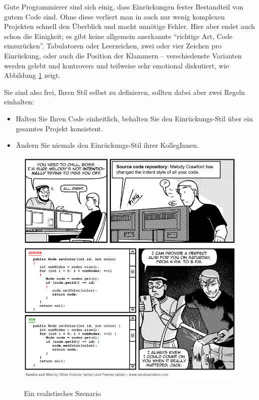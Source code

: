 \begin{hintbox}
Gute Programmierer sind sich einig, dass Einrückungen fester Bestandteil von gutem Code sind. Ohne diese verliert man in auch nur wenig komplexen Projekten schnell den Überblick und macht unnötige Fehler. Hier aber endet auch schon die Einigkeit; es gibt keine allgemein anerkannte \enquote{richtige Art, Code einzurücken}. Tabulatoren oder Leerzeichen, zwei oder vier Zeichen pro Einrückung, oder auch die Position der Klammern -- verschiedenste Varianten werden gelebt und kontrovers und teilweise sehr emotional diskutiert, wie Abbildung \ref{fig:IndentStyle} zeigt.

Sie sind also frei, Ihren Stil selbst zu definieren, sollten dabei aber zwei Regeln einhalten:
\begin{itemize}
\item Halten Sie Ihren Code einheitlich, \ie behalten Sie den Einrückungs-Stil über ein gesamtes Projekt konsistent.
\item Ändern Sie niemals den Einrückungs-Stil ihrer KollegInnen.
\end{itemize}
\end{hintbox}

\begin{figure}
	\href{http://www.sandraandwoo.com/2015/04/13/0674-there-are-10-types-of-programmers/}{
		\includegraphics[width=\linewidth]{./gfx/SW-indent-style}
	}
	\caption{Ein realistisches Szenario} \label{fig:IndentStyle}
\end{figure}

